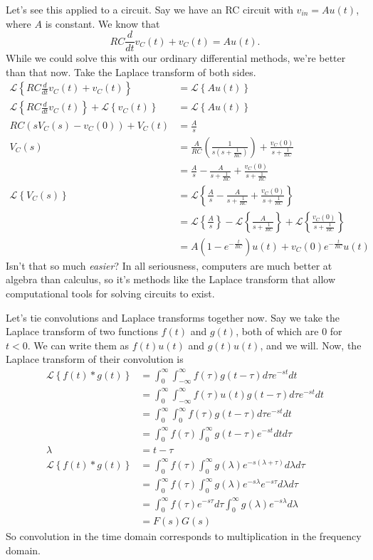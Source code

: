 \documentclass[nobib]{tufte-handout}
\begin{document}
Let's see this applied to a circuit. Say we have 
an RC circuit with $v_{in} = Au(t)$, where 
$A$ is constant. We know that 
\[RC \frac{d}{dt}v_C(t) + v_C(t) = Au(t).\]
While we could solve this with our ordinary 
differential methods, we're better than that now. 
Take the Laplace transform of both sides. 
\begin{align}
    \mathcal{L}\left\{RC \frac{d}{dt}v_C(t) + v_C(t)\right\} &= \mathcal{L}\left\{Au(t)\right\} \\
    \mathcal{L}\left\{RC \frac{d}{dt}v_C(t)\right\} + \mathcal{L}\left\{v_C(t)\right\} &= \mathcal{L}\left\{Au(t)\right\} \\
    RC \left(sV_C(s)-v_C(0)\right) + V_C(t)&= \frac{A}{s} \\
    V_C(s) &= \frac{A}{RC}\left(\frac{1}{s(s+\frac{1}{RC})}\right) + \frac{v_C(0)}{s + \frac{1}{RC}} \\
    &= \frac{A}{s} - \frac{A}{s+\frac{1}{RC}} + \frac{v_C(0)}{s+\frac{1}{RC}} \\
    \mathcal{L}\left\{V_C(s)\right\} &= \mathcal{L}\left\{\frac{A}{s} - \frac{A}{s+\frac{1}{RC}} + \frac{v_C(0)}{s+\frac{1}{RC}}\right\} \\
    &= \mathcal{L}\left\{\frac{A}{s}\right\} - \mathcal{L}\left\{\frac{A}{s+\frac{1}{RC}}\right\} + \mathcal{L}\left\{\frac{v_C(0)}{s+\frac{1}{RC}}\right\} \\
    &= A(1-e^{-\frac{t}{RC}})u(t) + v_C(0)e^{-\frac{t}{RC}}u(t)
\end{align}
Isn't that so much \emph{easier}? 
In all seriousness, computers are 
much better at algebra than calculus, 
so it's methods like the Laplace
transform that allow computational
tools for solving circuits to exist. 

Let's tie convolutions and Laplace 
transforms together now. Say we take the 
Laplace transform of two functions 
$f(t)$ and $g(t)$, both of which 
are $0$ for $t < 0$. We can write them 
as $f(t)u(t)$ and $g(t)u(t)$, and we 
will. Now, the Laplace transform 
of their convolution is 
\begin{align}
    \mathcal{L} \left\{f(t)*g(t)\right\} &= \int_0^{\infty} \int_{-\infty}^{\infty} f(\tau)g(t-\tau)d\tau e^{-st}dt \\
    &= \int_0^{\infty} \int_{-\infty}^{\infty} f(\tau)u(t) g(t-\tau)d\tau e^{-st}dt \\
    &= \int_0^{\infty} \int_{0}^{\infty} f(\tau) g(t-\tau)d\tau e^{-st}dt \\
    &= \int_0^{\infty} f(\tau) \int_{0}^{\infty} g(t-\tau) e^{-st}dt d\tau \\
    \lambda &= t - \tau \\
    \mathcal{L} \left\{f(t)*g(t)\right\} &= \int_0^{\infty} f(\tau) \int_{0}^{\infty} g(\lambda) e^{-s(\lambda+\tau)}d\lambda d\tau \\
    &= \int_0^{\infty} f(\tau) \int_{0}^{\infty} g(\lambda) e^{-s\lambda}e^{-s\tau}d\lambda d\tau \\
    &= \int_0^{\infty} f(\tau)e^{-s\tau}d\tau \int_{0}^{\infty} g(\lambda) e^{-s\lambda}d\lambda \\
    &= F(s)G(s)
\end{align}
So convolution in the time domain corresponds 
to multiplication in the frequency domain.
\end{document}
